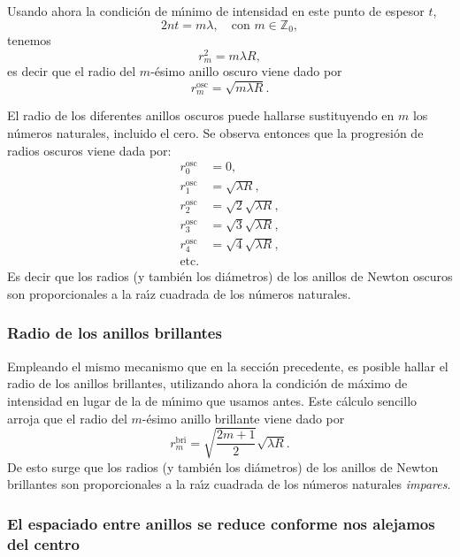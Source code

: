 \documentclass[a4paper]{article}
\newcommand{\Z}{\mathbb{Z}}
\begin{document}
Usando ahora la condici\'on de m\'\i nimo de intensidad en este punto de 
espesor $t$,
\begin{equation*}
    2 n t = m \lambda, \quad \text{con $m \in \Z_0$}, 
\end{equation*}
tenemos
\begin{equation*}
r_m^2 = m \lambda R,
\end{equation*}
es decir que el radio del $m$-\'esimo anillo oscuro viene dado por
\begin{equation}
    r_m^\text{osc} = \sqrt{m \lambda R}.
\end{equation}

El radio de los diferentes anillos oscuros puede hallarse sustituyendo en
$m$ los n\'umeros naturales, incluido el cero. Se observa entonces que la 
progresi\'on de radios oscuros viene dada por:
\begin{align*}
    r^\text{osc}_0 &= 0, \\
    r^\text{osc}_1 &= \sqrt{\lambda R}, \\
    r^\text{osc}_2 &= \sqrt{2} \sqrt{\lambda R}, \\
    r^\text{osc}_3 &= \sqrt{3} \sqrt{\lambda R}, \\
    r^\text{osc}_4 &= \sqrt{4} \sqrt{\lambda R}, \\
    \text{etc.}
\end{align*}
Es decir que los radios (y tambi\'en los di\'ametros) de los anillos de 
Newton oscuros son proporcionales a la ra\'\i z cuadrada de los n\'umeros
naturales.

\subsubsection{Radio de los anillos brillantes}

Empleando el mismo mecanismo que en la secci\'on precedente, es posible hallar
el radio de los anillos brillantes, utilizando ahora la condici\'on de m\'aximo
de intensidad en lugar de la de m\'\i nimo que usamos antes. Este c\'alculo
sencillo arroja que el radio del $m$-\'esimo anillo brillante viene dado por
\begin{equation}
    r^\text{bri}_m = \sqrt{\frac{2m+1}{2}} \sqrt{\lambda R}.
\end{equation}
De esto surge que los radios (y tambi\'en los di\'ametros) de los anillos
de Newton brillantes son proporcionales a la ra\'\i z cuadrada de los 
n\'umeros naturales {\it impares}. 

\subsubsection{El espaciado entre anillos se reduce conforme nos alejamos
del centro}
\end{document}
